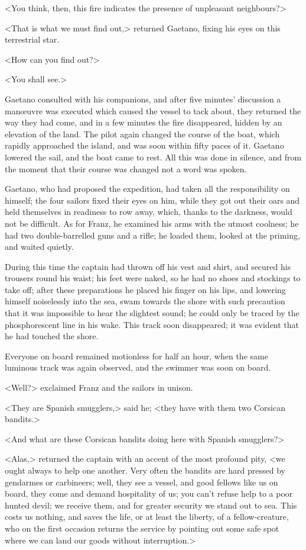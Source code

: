  <You think, then, this fire indicates the presence of unpleasant neighbours?> 

 <That is what we must find out,> returned Gaetano, fixing his eyes on this terrestrial star. 

 <How can you find out?> 

 <You shall see.> 

 Gaetano consulted with his companions, and after five minutes' discussion a manœuvre was executed which caused the vessel to tack about, they returned the way they had come, and in a few minutes the fire disappeared, hidden by an elevation of the land. The pilot again changed the course of the boat, which rapidly approached the island, and was soon within fifty paces of it. Gaetano lowered the sail, and the boat came to rest. All this was done in silence, and from the moment that their course was changed not a word was spoken. 

 Gaetano, who had proposed the expedition, had taken all the responsibility on himself; the four sailors fixed their eyes on him, while they got out their oars and held themselves in readiness to row away, which, thanks to the darkness, would not be difficult. As for Franz, he examined his arms with the utmost coolness; he had two double-barrelled guns and a rifle; he loaded them, looked at the priming, and waited quietly. 

 During this time the captain had thrown off his vest and shirt, and secured his trousers round his waist; his feet were naked, so he had no shoes and stockings to take off; after these preparations he placed his finger on his lips, and lowering himself noiselessly into the sea, swam towards the shore with such precaution that it was impossible to hear the slightest sound; he could only be traced by the phosphorescent line in his wake. This track soon disappeared; it was evident that he had touched the shore. 

 Everyone on board remained motionless for half an hour, when the same luminous track was again observed, and the swimmer was soon on board. 

 <Well?> exclaimed Franz and the sailors in unison. 

 <They are Spanish smugglers,> said he; <they have with them two Corsican bandits.> 

 <And what are these Corsican bandits doing here with Spanish smugglers?> 

 <Alas,> returned the captain with an accent of the most profound pity, <we ought always to help one another. Very often the bandits are hard pressed by gendarmes or carbineers; well, they see a vessel, and good fellows like us on board, they come and demand hospitality of us; you can't refuse help to a poor hunted devil; we receive them, and for greater security we stand out to sea. This costs us nothing, and saves the life, or at least the liberty, of a fellow-creature, who on the first occasion returns the service by pointing out some safe spot where we can land our goods without interruption.> 


